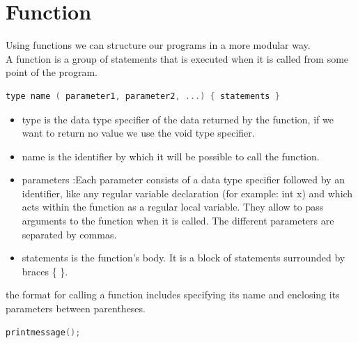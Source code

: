 \documentclass[12pt,oneside]{book}
\begin{document}
\section{Function}
Using functions we can structure our programs in a more modular way.\\
A function is a group of statements that is executed when it is called from some point of the program.
	\begin{lstlisting}[language=C++]
    type name ( parameter1, parameter2, ...) { statements }
\end{lstlisting}
\begin{itemize}
	\item type is the data type specifier of the data returned by the function, if we want to return no value we use the void type specifier.
	\item name is the identifier by which it will be possible to call the function.
	\item parameters :Each parameter consists of a data type specifier followed by an identifier, like any regular variable declaration (for example: int x) and which acts within the function as a regular local variable. They allow to pass arguments to the function when it is called. The different parameters are separated by commas.
	\item statements is the function's body. It is a block of statements surrounded by braces \{ \}.
\end{itemize}
the format for calling a function includes specifying its name and enclosing its parameters between parentheses.
	\begin{lstlisting}[language=C++]
    printmessage();
\end{lstlisting}
\end{document}
